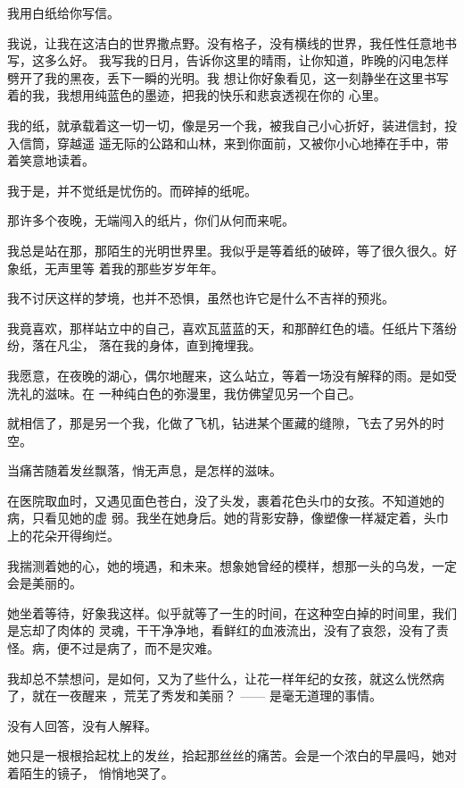 \documentclass[12pt,a4paper]{article}
\begin{document}
		我用白纸给你写信。

		我说，让我在这洁白的世界撒点野。没有格子，没有横线的世界，我任性任意地书写，这多么好。
	我写我的日月，告诉你这里的晴雨，让你知道，昨晚的闪电怎样劈开了我的黑夜，丢下一瞬的光明。我
	想让你好象看见，这一刻静坐在这里书写着的我，我想用纯蓝色的墨迹，把我的快乐和悲哀透视在你的
	心里。

		我的纸，就承载着这一切一切，像是另一个我，被我自己小心折好，装进信封，投入信筒，穿越遥
	遥无际的公路和山林，来到你面前，又被你小心地捧在手中，带着笑意地读着。


		我于是，并不觉纸是忧伤的。而碎掉的纸呢。


		那许多个夜晚，无端闯入的纸片，你们从何而来呢。

		我总是站在那，那陌生的光明世界里。我似乎是等着纸的破碎，等了很久很久。好象纸，无声里等
	着我的那些岁岁年年。

		我不讨厌这样的梦境，也并不恐惧，虽然也许它是什么不吉祥的预兆。

		我竟喜欢，那样站立中的自己，喜欢瓦蓝蓝的天，和那醉红色的墙。任纸片下落纷纷，落在凡尘，
	落在我的身体，直到掩埋我。

		我愿意，在夜晚的湖心，偶尔地醒来，这么站立，等着一场没有解释的雨。是如受洗礼的滋味。在
	一种纯白色的弥漫里，我仿佛望见另一个自己。


		就相信了，那是另一个我，化做了飞机，钻进某个匿藏的缝隙，飞去了另外的时空。

	\endwriting



		当痛苦随着发丝飘落，悄无声息，是怎样的滋味。

		在医院取血时，又遇见面色苍白，没了头发，裹着花色头巾的女孩。不知道她的病，只看见她的虚
	弱。我坐在她身后。她的背影安静，像塑像一样凝定着，头巾上的花朵开得绚烂。

		我揣测着她的心，她的境遇，和未来。想象她曾经的模样，想那一头的乌发，一定会是美丽的。

		她坐着等待，好象我这样。似乎就等了一生的时间，在这种空白掉的时间里，我们是忘却了肉体的
	灵魂，干干净净地，看鲜红的血液流出，没有了哀怨，没有了责怪。病，便不过是病了，而不是灾难。


		我却总不禁想问，是如何，又为了些什么，让花一样年纪的女孩，就这么恍然病了，就在一夜醒来
	，荒芜了秀发和美丽？ —— 是毫无道理的事情。

		没有人回答，没有人解释。

		她只是一根根拾起枕上的发丝，拾起那丝丝的痛苦。会是一个浓白的早晨吗，她对着陌生的镜子，
	悄悄地哭了。
\end{document}
